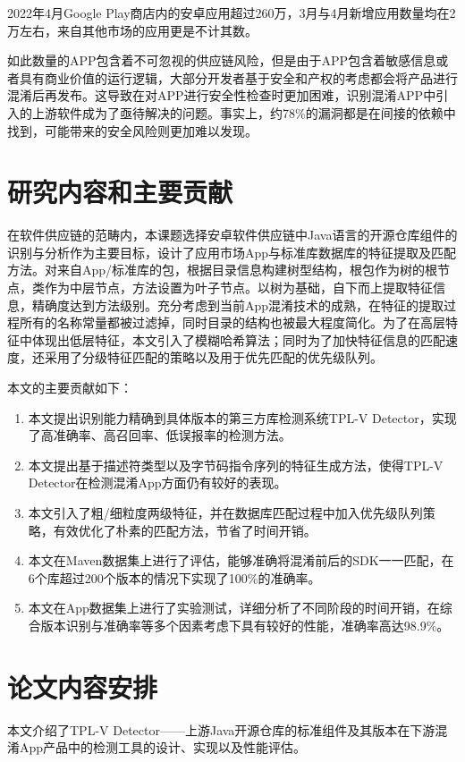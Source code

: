 2022年4月Google Play商店内的安卓应用超过260万，3月与4月新增应用数量均在2万左右，来自其他市场的应用更是不计其数。

如此数量的APP包含着不可忽视的供应链风险，但是由于APP包含着敏感信息或者具有商业价值的运行逻辑，大部分开发者基于安全和产权的考虑都会将产品进行混淆后再发布。这导致在对APP进行安全性检查时更加困难，识别混淆APP中引入的上游软件成为了亟待解决的问题。事实上，约78\%的漏洞都是在间接的依赖中找到，可能带来的安全风险则更加难以发现\cite{qianxin.com}。


\section{研究内容和主要贡献}
在软件供应链的范畴内，本课题选择安卓软件供应链中Java语言的开源仓库组件的识别与分析作为主要目标，设计了应用市场App与标准库数据库的特征提取及匹配方法。对来自App/标准库的包，根据目录信息构建树型结构，根包作为树的根节点，类作为中层节点，方法设置为叶子节点。以树为基础，自下而上提取特征信息，精确度达到方法级别。充分考虑到当前App混淆技术的成熟，在特征的提取过程所有的名称常量都被过滤掉，同时目录的结构也被最大程度简化。为了在高层特征中体现出低层特征，本文引入了模糊哈希算法；同时为了加快特征信息的匹配速度，还采用了分级特征匹配的策略以及用于优先匹配的优先级队列。

本文的主要贡献如下：

\begin{enumerate}
\item{本文提出识别能力精确到具体版本的第三方库检测系统TPL-V Detector，实现了高准确率、高召回率、低误报率的检测方法。}
\item{本文提出基于描述符类型以及字节码指令序列的特征生成方法，使得TPL-V Detector在检测混淆App方面仍有较好的表现。}
\item{本文引入了粗/细粒度两级特征，并在数据库匹配过程中加入优先级队列策略，有效优化了朴素的匹配方法，节省了时间开销。}
\item{本文在Maven数据集上进行了评估，能够准确将混淆前后的SDK一一匹配，在6个库超过200个版本的情况下实现了100\%的准确率。}
\item{本文在App数据集上进行了实验测试，详细分析了不同阶段的时间开销，在综合版本识别与准确率等多个因素考虑下具有较好的性能，准确率高达98.9\%。}
\end{enumerate}


\section{论文内容安排}
本文介绍了TPL-V Detector——上游Java开源仓库的标准组件及其版本在下游混淆App产品中的检测工具的设计、实现以及性能评估。

